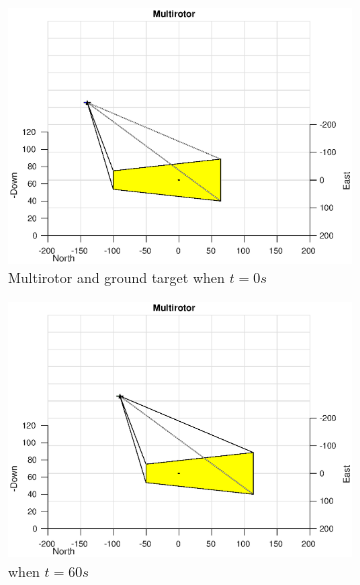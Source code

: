 \begin{figure}[htbp]
	\centering
	\begin{subfigure}[t]{0.45\linewidth}
		\includegraphics[width=\textwidth]{images/chapter4/inertial_UAV_0mps}
		\caption{Multirotor and ground target when $t=0s$}
	\end{subfigure}
	\begin{subfigure}[t]{0.45\linewidth}
		\includegraphics[width=\textwidth]{images/chapter4/inertial_UAV_0mps_60s}
		\caption{when $t=60s$}
	\end{subfigure}
	\begin{subfigure}[t]{0.45\linewidth}

\end{subfigure}
\end{figure}
